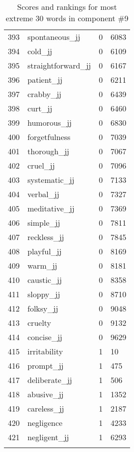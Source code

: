 \begin{longtable}[!htbp]{| rlr@{.}l |}
    393 & spontaneous\_jj & 0 & 6083 \\
    394 & cold\_jj & 0 & 6109 \\
    395 & straightforward\_jj & 0 & 6167 \\
    396 & patient\_jj & 0 & 6211 \\
    397 & crabby\_jj & 0 & 6439 \\
    398 & curt\_jj & 0 & 6460 \\
    399 & humorous\_jj & 0 & 6830 \\
    400 & forgetfulness & 0 & 7039 \\
    401 & thorough\_jj & 0 & 7067 \\
    402 & cruel\_jj & 0 & 7096 \\
    403 & systematic\_jj & 0 & 7133 \\
    404 & verbal\_jj & 0 & 7327 \\
    405 & meditative\_jj & 0 & 7369 \\
    406 & simple\_jj & 0 & 7811 \\
    407 & reckless\_jj & 0 & 7845 \\
    408 & playful\_jj & 0 & 8169 \\
    409 & warm\_jj & 0 & 8181 \\
    410 & caustic\_jj & 0 & 8358 \\
    411 & sloppy\_jj & 0 & 8710 \\
    412 & folksy\_jj & 0 & 9048 \\
    413 & cruelty & 0 & 9132 \\
    414 & concise\_jj & 0 & 9629 \\
    415 & irritability & 1 & 10 \\
    416 & prompt\_jj & 1 & 475 \\
    417 & deliberate\_jj & 1 & 506 \\
    418 & abusive\_jj & 1 & 1352 \\
    419 & careless\_jj & 1 & 2187 \\
    420 & negligence & 1 & 4233 \\
    421 & negligent\_jj & 1 & 6293 \\
    \hline
    \caption{Scores and rankings for most extreme 30 words in component \#9} \\
\end{longtable}
